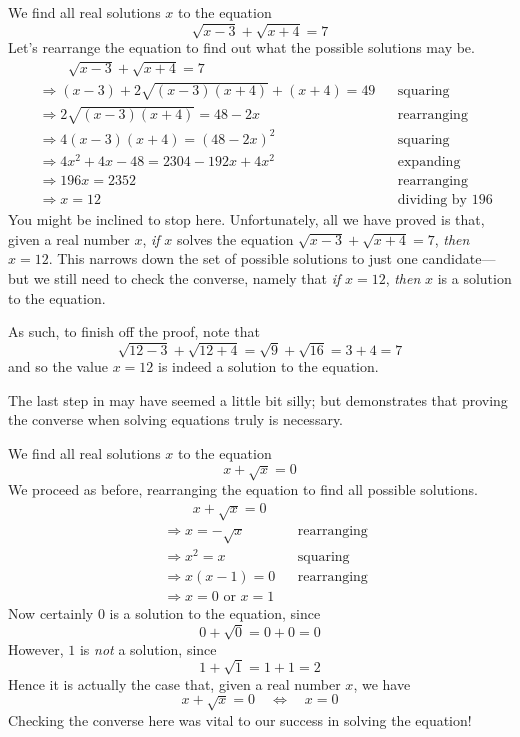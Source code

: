 \begin{example}
\label{exSolveSqrtFirstExample}
We find all real solutions $x$ to the equation
\[
\sqrt{x-3} + \sqrt{x+4} = 7
\]
Let's rearrange the equation to find out what the possible solutions may be.
\begin{align*}
&\phantom{\Rightarrow\;\;} \sqrt{x-3} + \sqrt{x+4} = 7 && \\
&\Rightarrow (x-3) + 2\sqrt{(x-3)(x+4)} + (x+4) = 49 && \text{squaring} \\
&\Rightarrow 2\sqrt{(x-3)(x+4)} = 48-2x && \text{rearranging} \\
&\Rightarrow 4(x-3)(x+4) = (48-2x)^2 && \text{squaring} \\
&\Rightarrow 4x^2+4x-48 = 2304-192x+4x^2 && \text{expanding} \\
&\Rightarrow 196x = 2352 && \text{rearranging} \\
&\Rightarrow x=12 && \text{dividing by $196$}
\end{align*}
You might be inclined to stop here. Unfortunately, all we have proved is that, given a real number $x$, \textit{if} $x$ solves the equation $\sqrt{x-3} + \sqrt{x+4} = 7$, \textit{then} $x=12$. This narrows down the set of possible solutions to just one candidate---but we still need to check the converse, namely that \textit{if} $x=12$, \textit{then} $x$ is a solution to the equation.

As such, to finish off the proof, note that
\[
\sqrt{12-3} + \sqrt{12+4} = \sqrt{9} + \sqrt{16} = 3 + 4 = 7
\]
and so the value $x=12$ is indeed a solution to the equation.
\end{example}

The last step in  may have seemed a little bit silly; but  demonstrates that proving the converse when solving equations truly is necessary.

\begin{example}
\label{exSolveSqrtSecondExample}
We find all real solutions $x$ to the equation
\[
x+\sqrt{x}=0
\]
We proceed as before, rearranging the equation to find all possible solutions.
\begin{align*}
&\phantom{\Rightarrow\;\;} x+\sqrt{x} = 0 && \\
&\Rightarrow x=-\sqrt{x} && \text{rearranging} \\
&\Rightarrow x^2=x && \text{squaring} \\
&\Rightarrow x(x-1)=0 && \text{rearranging} \\
&\Rightarrow x=0 \text{ or } x=1 && 
\end{align*}
Now certainly $0$ is a solution to the equation, since
\[
0+\sqrt{0} = 0+0 = 0
\]
However, $1$ is \textit{not} a solution, since
\[
1+\sqrt{1} = 1+1 = 2
\]
Hence it is actually the case that, given a real number $x$, we have
\[
x+\sqrt{x} = 0 \quad \Leftrightarrow \quad x=0
\]
Checking the converse here was vital to our success in solving the equation!
\end{example}

